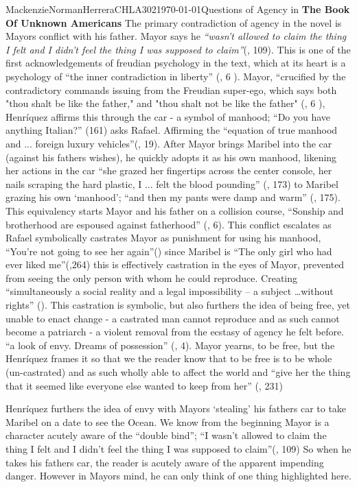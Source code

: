 \documentclass{article}
\begin{document}
\begin{mla}{Mackenzie}{Norman}{Herrera}{CHLA302}{\today}{Questions of Agency in \textbf{The Book Of Unknown Americans}}
The primary contradiction of agency in the novel is Mayors conflict with his father. Mayor says he 
\textit{``wasn’t allowed to claim the thing I felt and I didn’t feel the thing I was supposed to claim''}(\cite{Henriquez2014-sh}, 109). This is one of the first acknowledgements of freudian psychology in the text, which at its heart is a psychology of ``the inner contradiction in liberty'' (\cite{loves-bdy}, 6 ).
Mayor, ``crucified by the contradictory commands issuing from the Freudian super-ego, which says both "thou shalt be like the father," and "thou shalt not be like the father" (\cite{loves-bdy}, 6 ), Henríquez affirms this through the car - a symbol of manhood; ``Do you have anything Italian?'' (161) asks Rafael. Affirming the ``equation of  true manhood and ... foreign luxury vehicles''(\cite{Uhlman2015-qx}, 19). After Mayor brings Maribel into the car (against his fathers wishes), he quickly adopts it as his own manhood, likening her actions in the car ``she grazed her fingertips across the center console, her nails scraping the hard plastic, I ... felt the blood pounding'' (\cite{Henriquez2014-sh}, 173) to Maribel grazing his own `manhood'; ``and then my pants were damp and warm'' (\cite{Henriquez2014-sh}, 175). This equivalency starts Mayor and his father on a collision course, ``Sonship and brotherhood are espoused against fatherhood'' (\cite{loves-bdy}, 6). This conflict escalates as Rafael symbolically castrates Mayor as punishment for using his manhood, ``You're not going to see her again''(\cite{Henriquez2014-sh}) since Maribel is ``The only girl who had ever liked me''(\cite{Henriquez2014-sh},264) this is effectively castration in the eyes of Mayor, prevented from seeing the only person with whom he could reproduce.  Creating  ``simultaneously a social reality and a legal impossibility – a subject \dots without rights'' (\cite{Lutes_Travis_2021}). This castration is symbolic, but also furthers the idea of being free, yet unable to enact change - a castrated man cannot reproduce and as such cannot become a patriarch - a violent removal from the ecstasy of agency he felt before. ``a look of envy. Dreams of possession'' (\cite{wretched}, 4). Mayor yearns, to be free, but the Henríquez frames it so that we the reader know that to be free is to be whole (un-castrated) and as such wholly able to affect the world and ``give her the thing that it seemed like everyone else wanted to keep from her'' (\cite{Henriquez2014-sh}, 231) 

Henríquez furthers the idea of envy with Mayors `stealing' his fathers car to take Maribel on a date to see the Ocean. We know from the beginning Mayor is a character acutely aware of the ``double bind''; ``I wasn’t allowed to claim the thing I felt and I didn’t feel the thing I was supposed to claim''(\cite{Henriquez2014-sh}, 109)  So when he takes his fathers car, the reader is acutely aware of the apparent impending danger. However in Mayors mind, he can only think of one thing highlighted here.


\end{mla}
\end{document}
